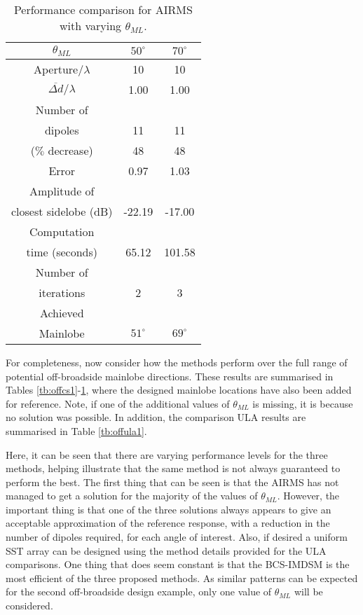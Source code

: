 \documentclass[10pt,final]{IEEEtran}
\begin{document}
\begin{table}
\caption{\rm Performance comparison for AIRMS with varying $\theta_{ML}$.} \centering
\begin{tabular}{|c|c|c|}
  \hline
  $\theta_{ML}$ & $50^{\circ}$ & $70^{\circ}$ \\
  \hline
  Aperture/$\lambda$ &10  & 10  \\
  $\overline{\Delta{d}}/\lambda$ &1.00 & 1.00    \\
  \hline
  Number of &  &     \\
  dipoles & 11&11   \\
  ($\%$ decrease) & 48 &  48 \\
  \hline
  Error &0.97  &1.03    \\
  \hline
  Amplitude of &  &    \\
  closest sidelobe (dB)& -22.19 & -17.00  \\
  \hline
  Computation &  &     \\
  time (seconds) &65.12  &   101.58  \\
  \hline
  Number of &  &     \\
  iterations & 2 &  3   \\
  \hline
  Achieved & &  \\
   Mainlobe & $51^{\circ}$ &$69^{\circ}$     \\
  \hline
\end{tabular}
\label{tb:offairms1}
\end{table}

For completeness, now consider how the methods perform over the full range of potential off-broadside mainlobe directions.  These results are summarised in Tables \ref{tb:offcs1}-\ref{tb:offairms1}, where the designed mainlobe locations have also been added for reference.  Note, if one of the additional values of $\theta_{ML}$ is missing, it is because no solution was possible.  In addition, the comparison ULA results are summarised in Table \ref{tb:offula1}.

Here, it can be seen that there are varying performance levels for the three methods, helping illustrate that the same method is not always guaranteed to perform the best.  The first thing that can be seen is that the AIRMS has not managed to get a solution for the majority of the values of $\theta_{ML}$. However, the important thing is that one of the three solutions always appears to give an acceptable approximation of the reference response, with a reduction in the number of dipoles required, for each angle of interest.  Also, if desired a uniform SST array can be designed using the method details provided for the ULA comparisons.  One thing that does seem constant is that the BCS-IMDSM is the most efficient of the three proposed methods.  As similar patterns can be expected for the second off-broadside design example, only one value of $\theta_{ML}$ will be considered.
\end{document}
